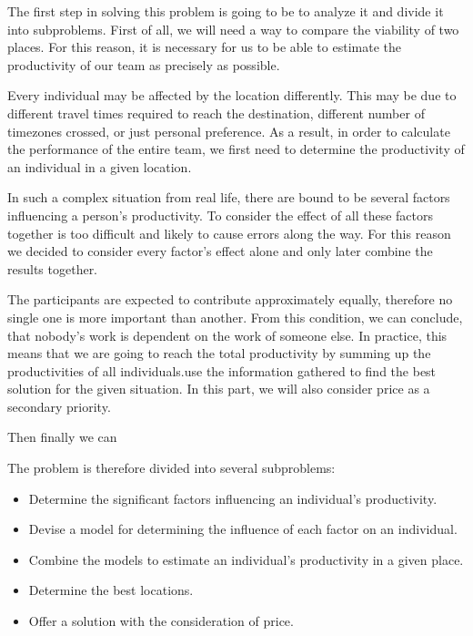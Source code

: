 
The first step in solving this problem is going to be to analyze it and divide it into subproblems. First of all, we will need a way to compare the viability of two places. For this reason, it is necessary for us to be able to estimate the productivity of our team as precisely as possible.

Every individual may be affected by the location differently. This may be due to different travel times required to reach the destination, different number of timezones crossed, or just personal preference. As a result, in order to calculate the performance of the entire team, we first need to determine the productivity of an individual in a given location. 

In such a complex situation from real life, there are bound to be several factors influencing a person's productivity. To consider the effect of all these factors together is too difficult and likely to cause errors along the way. For this reason we decided to consider every factor's effect alone and only later combine the results together.

The participants are expected to contribute approximately equally, therefore no single one is more important than another. From this condition, we can conclude, that nobody's work is dependent on the work of someone else. In practice, this means that we are going to reach the total productivity by summing up the productivities of all individuals.use the information gathered to find the best solution for the given situation. In this part, we will also consider price as a secondary priority.

Then finally we can 

The problem is therefore divided into several subproblems:
\begin{itemize}
\item Determine the significant factors influencing an individual's  productivity.
\item Devise a model for determining the influence of each factor on an individual.
\item Combine the models to estimate an individual's productivity in a given place.
\item Determine the best locations.
\item Offer a solution with the consideration of price.
\end{itemize}